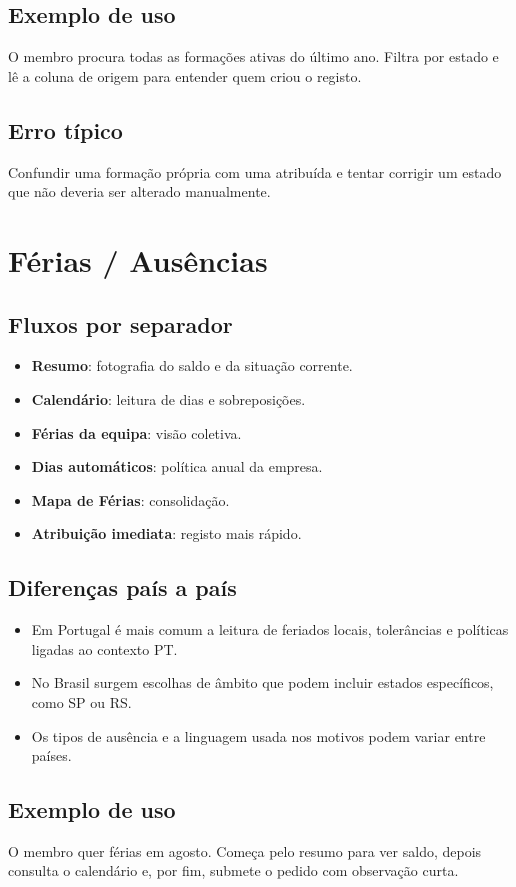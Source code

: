 \subsection{Exemplo de uso}
O membro procura todas as formações ativas do último ano. Filtra por estado e lê a coluna de origem para entender quem criou o registo.

\subsection{Erro típico}
Confundir uma formação própria com uma atribuída e tentar corrigir um estado que não deveria ser alterado manualmente.

\section{Férias / Ausências}
\subsection{Fluxos por separador}
\begin{itemize}
  \item \textbf{Resumo}: fotografia do saldo e da situação corrente.
  \item \textbf{Calendário}: leitura de dias e sobreposições.
  \item \textbf{Férias da equipa}: visão coletiva.
  \item \textbf{Dias automáticos}: política anual da empresa.
  \item \textbf{Mapa de Férias}: consolidação.
  \item \textbf{Atribuição imediata}: registo mais rápido.
\end{itemize}

\subsection{Diferenças país a país}
\begin{itemize}
  \item Em Portugal é mais comum a leitura de feriados locais, tolerâncias e políticas ligadas ao contexto PT.
  \item No Brasil surgem escolhas de âmbito que podem incluir estados específicos, como SP ou RS.
  \item Os tipos de ausência e a linguagem usada nos motivos podem variar entre países.
\end{itemize}

\subsection{Exemplo de uso}
O membro quer férias em agosto. Começa pelo resumo para ver saldo, depois consulta o calendário e, por fim, submete o pedido com observação curta.

